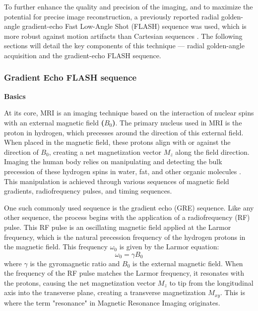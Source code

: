 \documentclass{micro-econ-thesis}
\begin{document}
  
To further enhance the quality and precision of the imaging, and to maximize the potential for precise image reconstruction, a previously reported radial golden-angle gradient-echo Fast Low-Angle Shot (FLASH) sequence was used, which is more robust against motion artifacts than Cartesian sequences \parencite{aleksiev_high-resolution_2022}. The following sections will detail the key components of this technique — radial golden-angle acquisition and the gradient-echo FLASH sequence.

\subsubsection{Gradient Echo FLASH sequence}

\textbf{Basics}

At its core, MRI is an imaging technique based on the interaction of nuclear spins with an external magnetic field \textbf{($B_0$)}. The primary nucleus used in MRI is the proton in hydrogen, which precesses around the direction of this external field.  When placed in the magnetic field, these protons align with or against the direction of \textbf{$B_0$}, creating a net magnetization vector \textbf{$M_z$} along the field direction. Imaging the human body relies on manipulating and detecting the bulk precession of these hydrogen spins in water, fat, and other organic molecules \parencite{brown_magnetic_2014}. This manipulation is achieved through various sequences of magnetic field gradients, radiofrequency pulses, and timing sequences. 


One such commonly used sequence is the gradient echo (GRE) sequence. Like any other sequence, the process begins with the application of a radiofrequency (RF) pulse. This RF pulse is an oscillating magnetic field applied at the Larmor frequency, which is the natural precession frequency of the hydrogen protons in the magnetic field. This frequency $\omega_0$ is given by the Larmor equation:
\begin{equation}
	\omega_0 = \gamma B_0
	\label{eq:larmor}
\end{equation}
where $\gamma$ is the gyromagnetic ratio and $B_0$ is the external magnetic field.
When the frequency of the RF pulse matches the Larmor frequency, it resonates with the protons, causing the net magnetization vector \textbf{$M_z$} to tip from the longitudinal axis into the transverse plane, creating a transverse magnetization \textbf{$M_{xy}$}. This is where the term "resonance" in Magnetic Resonance Imaging originates. 
\end{document}
